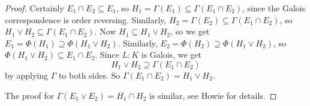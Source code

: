 \begin{proof}
  Certainly $E_1 \cap E_2 \subseteq E_1$, so
  $H_1 = \Gamma(E_1) \subseteq \Gamma(E_1 \cap E_2)$,
  since the Galois correspondence is order
  reversing. Similarly,
  $H_2 = \Gamma(E_2) \subseteq \Gamma(E_1 \cap E_2)$,
  so $H_1 \lor H_2 \subseteq \Gamma(E_1 \cap E_2)$.
  Now $H_1 \subseteq H_1 \lor H_2$, so we get
  $E_1 = \Phi(H_1) \supseteq \Phi(H_1 \lor H_2)$.
  Similarly, $E_2 = \Phi(H_2) \supseteq \Phi(H_1 \lor H_2)$,
  so $\Phi(H_1 \lor H_2) \subseteq E_1 \cap E_2$.
  Since $L : K$ is Galois, we get
  \[
    H_1 \lor H_2 \supseteq \Gamma(E_1 \cap E_2)
  \]
  by applying $\Gamma$ to both sides. So
  $\Gamma(E_1 \cap E_2) = H_1 \lor H_2$.

  The proof for $\Gamma(E_1 \lor E_2) = H_1 \cap H_2$
  is similar, see Howie for details.
\end{proof}
